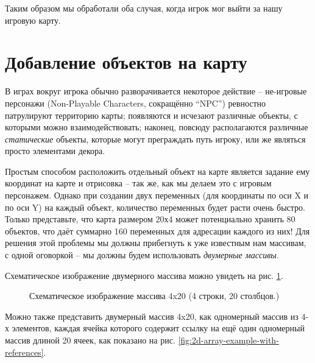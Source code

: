 \documentclass[../sparc.tex]{subfiles}
\begin{document}
Таким образом мы обработали оба случая, когда игрок мог выйти за нашу игровую
карту.

\section{Добавление объектов на карту}

В играх вокруг игрока обычно разворачивается некоторое действие -- не-игровые
персонажи (Non-Playable Characters, сокращённо ``NPC'') ревностно патрулируют
территорию карты; появляются и исчезают различные объекты, с которыми можно
взаимодействовать; наконец, повсюду располагаются различные \emph{статические}
объекты, которые могут преграждать путь игроку, или же являться просто
элементами декора.

Простым способом расположить отдельный объект на карте является задание ему
координат на карте и отрисовка -- так же, как мы делаем это с игровым
персонажем.  Однако при создании двух переменных (для координаты по оси X и по
оси Y) на каждый объект, количество переменных будет расти очень быстро.  Только
представьте, что карта размером 20х4 может потенциально хранить 80 объектов, что
даёт суммарно 160 переменных для адресации каждого из них!  Для решения этой
проблемы мы должны прибегнуть к уже известным нам массивам, с одной оговоркой --
мы должны будем использовать \emph{двумерные массивы}.

Схематическое изображение двумерного массива можно увидеть на
рис. \ref{fig:2d-array-example}.

\begin{figure}[ht]
  \centering
  \caption{Схематическое изображение массива 4x20 (4 строки, 20 столбцов.)}
  \label{fig:2d-array-example}
\end{figure}

Можно также представить двумерный массив 4x20, как одномерный массив из 4-х
элементов, каждая ячейка которого содержит ссылку на ещё один одномерный массив
длиной 20 ячеек, как показано на
рис. \ref{fig:2d-array-example-with-references}.
\end{document}
